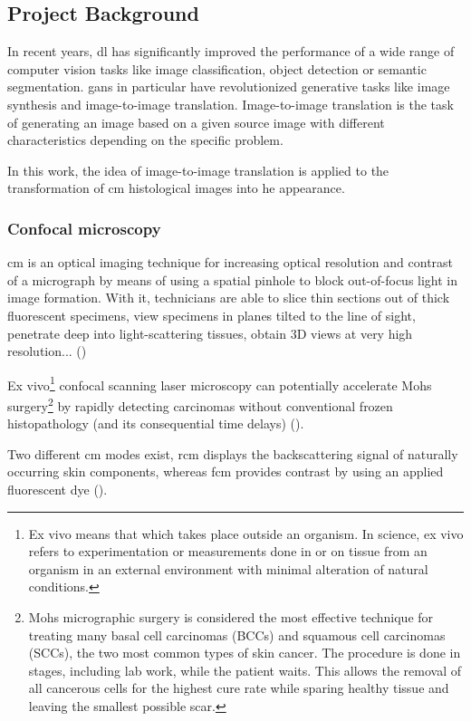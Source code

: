 \documentclass[../main.tex]{subfiles}
\begin{document}
\subsection{Project Background}
\label{sec:project-background}

In recent years, \gls{dl} has significantly improved the
performance of a wide range of computer vision tasks like image classification,
object detection or semantic segmentation.
\gls{gans} in particular have revolutionized generative tasks like image synthesis
and image-to-image translation.
Image-to-image translation is the task of generating an image based on a
given source image with different characteristics depending on the specific problem.

In this work, the idea of image-to-image translation is applied
to the transformation of \gls{cm} histological images into \gls{he} appearance.

\subsubsection{Confocal microscopy}
\gls{cm} is an optical imaging technique for increasing optical resolution
and contrast of a micrograph by means of using a spatial pinhole to block
out-of-focus light in image formation. With it, technicians are able to slice
thin sections out of thick fluorescent specimens, view specimens
in planes tilted to the line of sight, penetrate deep into light-scattering
tissues, obtain 3D views at very high resolution... (\cite{Inoue2006})

Ex vivo\footnote{Ex vivo means that which takes place outside an organism.
In science, ex vivo refers to experimentation or measurements done in or on
tissue from an organism in an external environment with minimal alteration
of natural conditions.} confocal scanning laser microscopy can potentially
accelerate Mohs surgery\footnote{Mohs micrographic surgery is considered the
most effective technique for treating many basal cell carcinomas (BCCs) and
squamous cell carcinomas (SCCs), the two most common types of skin cancer.
The procedure is done in stages, including lab work, while the patient waits.
This allows the removal of all cancerous cells for the highest cure rate
while sparing healthy tissue and leaving the smallest possible scar.}
by rapidly detecting carcinomas without conventional frozen histopathology
(and its consequential time delays) (\cite{Chung2005}).

Two different \gls{cm} modes exist, \gls{rcm} displays the backscattering signal
of naturally occurring skin components, whereas \gls{fcm} provides contrast
by using an applied fluorescent dye (\cite{Skvara2012}).
\end{document}
